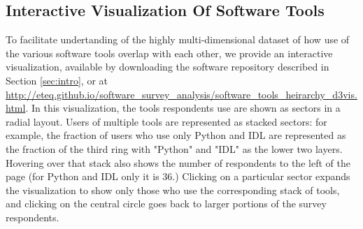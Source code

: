 \subsection{Interactive Visualization Of Software Tools}
\label{ssec:d3viz}

To facilitate undertanding of the highly multi-dimensional dataset of how use of the various software tools overlap with each other, we provide an interactive visualization, available by downloading the software repository described in Section \ref{sec:intro}, or at \url{http://eteq.github.io/software_survey_analysis/software_tools_heirarchy_d3vis.html}. In this visualization, the tools respondents use are shown as sectors in a radial layout.  Users of multiple tools are represented as stacked sectors: for example, the fraction of users who use only Python and IDL are represented as the fraction of the third ring with "Python" and "IDL" as the lower two layers.  Hovering over that stack also shows the number of respondents to the left of the page (for Python and IDL only it is 36.)  Clicking on a particular sector expands the visualization to show only those who use the corresponding stack of tools, and clicking on the central circle goes back to larger portions of the survey respondents.